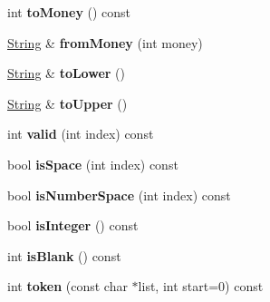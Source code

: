 \begin{DoxyCompactItemize}
\item 
int {\bfseries to\+Money} () const \hypertarget{class_magnum_1_1_string_a7332f0ba42395204a4ce804803ebfe65}{}\label{class_magnum_1_1_string_a7332f0ba42395204a4ce804803ebfe65}

\item 
\hyperlink{class_magnum_1_1_string}{String} \& {\bfseries from\+Money} (int money)\hypertarget{class_magnum_1_1_string_afe83963fde21d97a5d14b73f6e1ae3dd}{}\label{class_magnum_1_1_string_afe83963fde21d97a5d14b73f6e1ae3dd}

\item 
\hyperlink{class_magnum_1_1_string}{String} \& {\bfseries to\+Lower} ()\hypertarget{class_magnum_1_1_string_aa88d793b2c2d0b898344a921ffc5a1c9}{}\label{class_magnum_1_1_string_aa88d793b2c2d0b898344a921ffc5a1c9}

\item 
\hyperlink{class_magnum_1_1_string}{String} \& {\bfseries to\+Upper} ()\hypertarget{class_magnum_1_1_string_a5a0151191f5690d728bca9e1b35505fd}{}\label{class_magnum_1_1_string_a5a0151191f5690d728bca9e1b35505fd}

\item 
int {\bfseries valid} (int index) const \hypertarget{class_magnum_1_1_string_a588730ad258b8b624344d0dae1faac80}{}\label{class_magnum_1_1_string_a588730ad258b8b624344d0dae1faac80}

\item 
bool {\bfseries is\+Space} (int index) const \hypertarget{class_magnum_1_1_string_ab106633ce2f8eb28c674b2cef6309eee}{}\label{class_magnum_1_1_string_ab106633ce2f8eb28c674b2cef6309eee}

\item 
bool {\bfseries is\+Number\+Space} (int index) const \hypertarget{class_magnum_1_1_string_a1ba159ea195994894144fef0e20b9b40}{}\label{class_magnum_1_1_string_a1ba159ea195994894144fef0e20b9b40}

\item 
bool {\bfseries is\+Integer} () const \hypertarget{class_magnum_1_1_string_a956eb4638bd6a25d647d3d12f9a69e02}{}\label{class_magnum_1_1_string_a956eb4638bd6a25d647d3d12f9a69e02}

\item 
int {\bfseries is\+Blank} () const \hypertarget{class_magnum_1_1_string_a31a2aaab0d0d76c7cf15e59d218919c5}{}\label{class_magnum_1_1_string_a31a2aaab0d0d76c7cf15e59d218919c5}

\item 
int {\bfseries token} (const char $\ast$list, int start=0) const \hypertarget{class_magnum_1_1_string_a4f075eafcc39eb6ffbf279bae833383f}{}\label{class_magnum_1_1_string_a4f075eafcc39eb6ffbf279bae833383f}


\end{DoxyCompactItemize}
